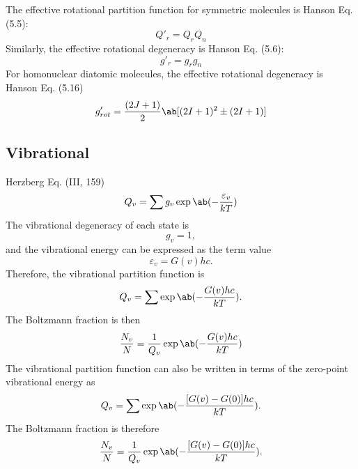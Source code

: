 \documentclass[11pt, twoside, fleqn]{report}
\begin{document}
    The effective rotational partition function for symmetric molecules is Hanson Eq. (5.5):
    \begin{equation*}
        Q'_r = Q_rQ_n
    \end{equation*}
    Similarly, the effective rotational degeneracy is Hanson Eq. (5.6):
    \begin{equation*}
        g'_r = g_rg_n
    \end{equation*}
    For homonuclear diatomic molecules, the effective rotational degeneracy is Hanson Eq. (5.16)
    \begin{equation*}
        g'_{rot} = \frac{(2J + 1)}{2}\ab[(2I + 1)^2 \pm (2I + 1)]
    \end{equation*}

    \subsection{Vibrational}

    Herzberg Eq. (III, 159)
    \begin{equation*}
        Q_v = \sum g_v\exp\ab(-\frac{\varepsilon_v}{kT})
    \end{equation*}
    The vibrational degeneracy of each state is
    \begin{equation*}
        g_v = 1,
    \end{equation*}
    and the vibrational energy can be expressed as the term value
    \begin{equation*}
        \varepsilon_v = G(v)hc.
    \end{equation*}
    Therefore, the vibrational partition function is
    \begin{equation*}
        Q_v = \sum \exp\ab(-\frac{G(v)hc}{kT}).
    \end{equation*}
    The Boltzmann fraction is then
    \begin{equation*}
        \frac{N_v}{N} = \frac{1}{Q_v}\exp\ab(-\frac{G(v)hc}{kT})
    \end{equation*}
    The vibrational partition function can also be written in terms of the zero-point vibrational energy as
    \begin{equation*}
        Q_v = \sum \exp\ab(-\frac{[G(v) - G(0)]hc}{kT}).
    \end{equation*}
    The Boltzmann fraction is therefore
    \begin{equation*}
        \frac{N_v}{N} = \frac{1}{Q_v}\exp\ab(-\frac{[G(v) - G(0)]hc}{kT}).
    \end{equation*}
\end{document}
